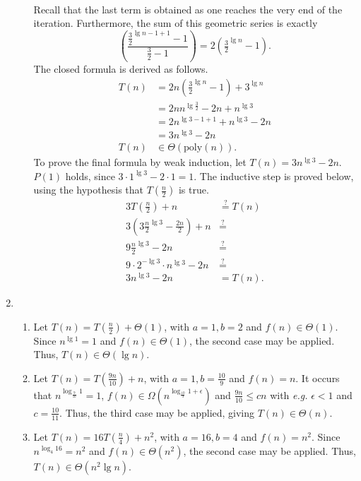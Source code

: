 \documentclass[12pt]{article}
\newcommand{\posseq}{\stackrel{?}{=}}
\begin{document}
\begin{enumerate}
\begin{enumerate}
\begin{align*}
    \end{align*}
    Recall that the last term is obtained as one reaches the very end of the iteration. Furthermore, the sum of this geometric series is exactly \[\left(\frac{\frac{3}{2}^{\lg n - 1+ 1} - 1}{\frac{3}{2} - 1}\right) = 2(\tfrac{3}{2}^{\lg n} - 1).\]
    The closed formula is derived as follows.
    \begin{align*}
      T(n) &= 2n(\tfrac{3}{2}^{\lg n} - 1) + 3^{\lg n} \\
      &= 2nn^{\lg \tfrac{3}{2}} - 2n + n^{\lg 3} \\
      &= 2n^{\lg 3 - 1 + 1} + n^{\lg 3} - 2n \\
      &= 3n^{\lg 3} - 2n \\
      T(n) &\in \Theta(\text{poly}(n)).
    \end{align*}
    To prove the final formula by weak induction, let $T(n) = 3n^{\lg 3} - 2n$. $P(1)$ holds, since $3 \cdot 1^{\lg 3} - 2 \cdot 1 = 1$. The inductive step is proved below, using the hypothesis that $T(\frac{n}{2})$ is true.
    \begin{align*}
      3T(\tfrac{n}{2}) + n &\posseq T(n) \\
      3(3\tfrac{n}{2}^{\lg 3} - \tfrac{2n}{2}) + n &\posseq \\
      9\tfrac{n}{2}^{\lg 3} - 2n &\posseq \\
      9 \cdot 2^{-\lg 3} \cdot n^{\lg 3} - 2n &\posseq \\
      3n^{\lg 3} - 2n &= T(n).
    \end{align*}
  \end{enumerate}
  \item
  \begin{enumerate}
    \item Let $T(n) = T(\frac{n}{2}) + \Theta(1)$, with $a = 1, b = 2$ and $f(n) \in \Theta(1)$. Since $n^{\lg 1} = 1$ and $f(n) \in \Theta(1)$, the second case may be applied. Thus, $T(n) \in \Theta(\lg n)$.
    \item Let $T(n) = T(\frac{9n}{10}) + n$, with $a = 1, b = \frac{10}{9}$ and $f(n) = n$. It occurs that $n^{\log_{\frac{9}{10}} 1} = 1$, $f(n) \in \Omega(n^{\log_{\frac{10}{9}} 1 + \epsilon})$ and $\frac{9n}{10} \leq cn$ with \emph{e.g.} $\epsilon < 1$ and $c = \frac{10}{11}$. Thus, the third case may be applied, giving $T(n) \in \Theta(n)$.
    \item Let $T(n) = 16T(\frac{n}{4}) + n^{2}$, with $a = 16, b = 4$ and $f(n) = n^{2}$. Since $n^{\log_{4} 16} = n^{2}$ and $f(n) \in \Theta(n^{2})$, the second case may be applied. Thus, $T(n) \in \Theta(n^{2} \lg n)$.

\end{enumerate}
\end{enumerate}
\end{document}

